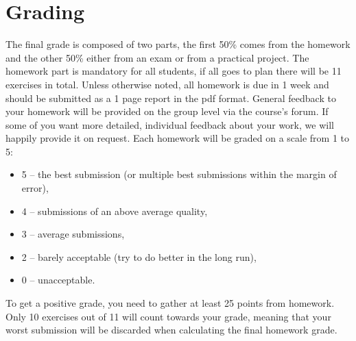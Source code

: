 \documentclass[fleqn,moreauthors,10pt]{ds_report}
\begin{document}
\flushbottom

\maketitle

\thispagestyle{empty} 



\section*{Grading}

The final grade is composed of two parts, the first 50\% comes from the homework and the other 50\% either from an exam or from a practical project. The homework part is mandatory for all students, if all goes to plan there will be 11 exercises in total. Unless otherwise noted, all homework is due in 1 week and should be submitted as a 1 page report in the pdf format. General feedback to your homework will be provided on the group level via the course's forum. If some of you want more detailed, individual feedback about your work, we will happily provide it on request. Each homework will be graded on a scale from 1 to 5:

\begin{itemize}
	\item 5 -- the best submission (or multiple best submissions within the margin of error),
	\item 4 -- submissions of an above average quality,
	\item 3 -- average submissions,
	\item 2 -- barely acceptable (try to do better in the long run),
	\item 0 -- unacceptable.
\end{itemize}

To get a positive grade, you need to gather at least 25 points from homework. Only 10 exercises out of 11 will count towards your grade, meaning that your worst submission will be discarded when calculating the final homework grade.
\end{document}
